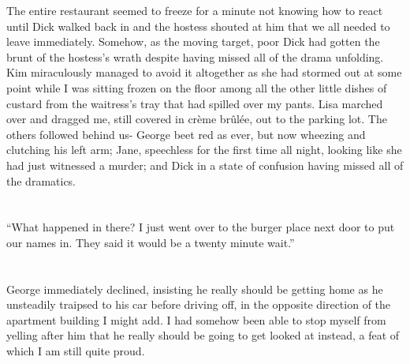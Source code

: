 \documentclass[]{book}
\begin{document}
The entire restaurant seemed to freeze for a minute not knowing how to
react until Dick walked back in and the hostess shouted at him that we
all needed to leave immediately. Somehow, as the moving target, poor
Dick had gotten the brunt of the hostess's wrath despite having missed
all of the drama unfolding. Kim miraculously managed to avoid it
altogether as she had stormed out at some point while I was sitting
frozen on the floor among all the other little dishes of custard from
the waitress's tray that had spilled over my pants. Lisa marched over
and dragged me, still covered in crème brûlée, out to the parking lot.
The others followed behind us- George beet red as ever, but now wheezing
and clutching his left arm; Jane, speechless for the first time all
night, looking like she had just witnessed a murder; and Dick in a state
of confusion having missed all of the dramatics.

\chapter{}\label{section-8}

``What happened in there? I just went over to the burger place next door
to put our names in. They said it would be a twenty minute wait.''

\chapter{}\label{section-9}

George immediately declined, insisting he really should be getting home
as he unsteadily traipsed to his car before driving off, in the opposite
direction of the apartment building I might add. I had somehow been able
to stop myself from yelling after him that he really should be going to
get looked at instead, a feat of which I am still quite proud.
\end{document}
